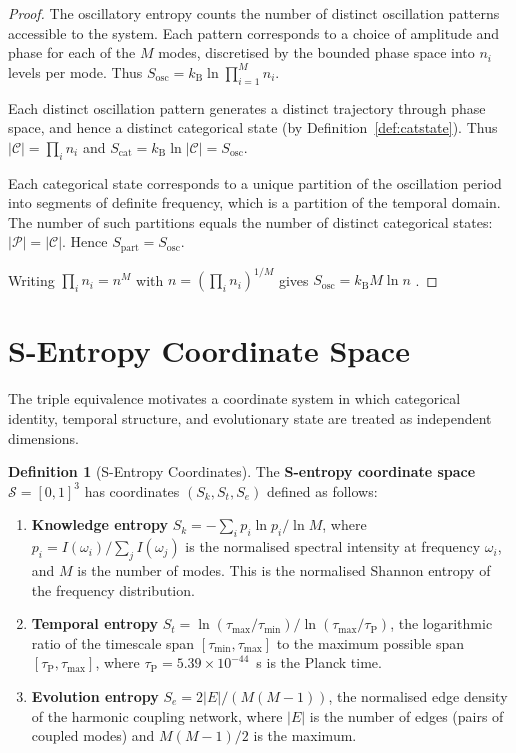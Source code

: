 \documentclass[11pt,twocolumn,a4paper]{article}
\theoremstyle{definition}
\newtheorem{definition}[theorem]{Definition}
\theoremstyle{remark}
\newcommand{\kB}{k_{\mathrm{B}}}
\newcommand{\Partition}{\mathcal{P}}
\newcommand{\Cat}{\mathcal{C}}
\newcommand{\Sk}{S_k}
\newcommand{\St}{S_t}
\newcommand{\Se}{S_e}
\newcommand{\Sspace}{\mathcal{S}}
\begin{document}
\begin{proof}
The oscillatory entropy counts the number of distinct oscillation patterns accessible to the system. Each pattern corresponds to a choice of amplitude and phase for each of the $M$ modes, discretised by the bounded phase space into $n_i$ levels per mode. Thus $S_{\mathrm{osc}} = \kB \ln \prod_{i=1}^M n_i$.

Each distinct oscillation pattern generates a distinct trajectory through phase space, and hence a distinct categorical state (by Definition~\ref{def:catstate}). Thus $|\Cat| = \prod_i n_i$ and $S_{\mathrm{cat}} = \kB \ln |\Cat| = S_{\mathrm{osc}}$.

Each categorical state corresponds to a unique partition of the oscillation period into segments of definite frequency, which is a partition of the temporal domain. The number of such partitions equals the number of distinct categorical states: $|\Partition| = |\Cat|$. Hence $S_{\mathrm{part}} = S_{\mathrm{osc}}$.

Writing $\prod_i n_i = n^M$ with $n = (\prod_i n_i)^{1/M}$ gives $S_{\mathrm{osc}} = \kB M \ln n$ \citep{boltzmann1877}.
\end{proof}

\section{S-Entropy Coordinate Space}
\label{sec:sentropy}

The triple equivalence motivates a coordinate system in which categorical identity, temporal structure, and evolutionary state are treated as independent dimensions.

\begin{definition}[S-Entropy Coordinates]
\label{def:sentropy}
The \textbf{S-entropy coordinate space} $\Sspace = [0,1]^3$ has coordinates $(\Sk, \St, \Se)$ defined as follows:
\begin{enumerate}[label=(\alph*)]
  \item \textbf{Knowledge entropy} $\Sk = -\sum_i p_i \ln p_i / \ln M$, where $p_i = I(\omega_i) / \sum_j I(\omega_j)$ is the normalised spectral intensity at frequency $\omega_i$, and $M$ is the number of modes. This is the normalised Shannon entropy \citep{shannon1948} of the frequency distribution.
  \item \textbf{Temporal entropy} $\St = \ln(\tau_{\max}/\tau_{\min}) / \ln(\tau_{\max}/\tau_{\mathrm{P}})$, the logarithmic ratio of the timescale span $[\tau_{\min}, \tau_{\max}]$ to the maximum possible span $[\tau_{\mathrm{P}}, \tau_{\max}]$, where $\tau_{\mathrm{P}} = 5.39 \times 10^{-44}$~s is the Planck time.
  \item \textbf{Evolution entropy} $\Se = 2|E| / (M(M-1))$, the normalised edge density of the harmonic coupling network, where $|E|$ is the number of edges (pairs of coupled modes) and $M(M-1)/2$ is the maximum.
\end{enumerate}
\end{definition}
\end{document}
